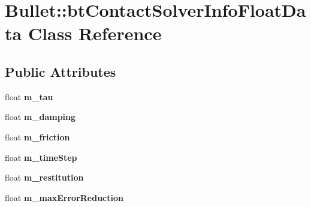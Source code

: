 \hypertarget{class_bullet_1_1bt_contact_solver_info_float_data}{\section{Bullet\+:\+:bt\+Contact\+Solver\+Info\+Float\+Data Class Reference}
\label{class_bullet_1_1bt_contact_solver_info_float_data}
}
\subsection*{Public Attributes}
\begin{DoxyCompactItemize}
\item 
\hypertarget{class_bullet_1_1bt_contact_solver_info_float_data_a7129b273c12109d4a66d04f61699b106}{float {\bfseries m\+\_\+tau}}\label{class_bullet_1_1bt_contact_solver_info_float_data_a7129b273c12109d4a66d04f61699b106}

\item 
\hypertarget{class_bullet_1_1bt_contact_solver_info_float_data_a5e024c1fbf7d2917ba3f3584804ce085}{float {\bfseries m\+\_\+damping}}\label{class_bullet_1_1bt_contact_solver_info_float_data_a5e024c1fbf7d2917ba3f3584804ce085}

\item 
\hypertarget{class_bullet_1_1bt_contact_solver_info_float_data_a78e2405d043575444710b9d87e1d3880}{float {\bfseries m\+\_\+friction}}\label{class_bullet_1_1bt_contact_solver_info_float_data_a78e2405d043575444710b9d87e1d3880}

\item 
\hypertarget{class_bullet_1_1bt_contact_solver_info_float_data_a4d8969c27712abc78dd05fc36bcf7c0e}{float {\bfseries m\+\_\+time\+Step}}\label{class_bullet_1_1bt_contact_solver_info_float_data_a4d8969c27712abc78dd05fc36bcf7c0e}

\item 
\hypertarget{class_bullet_1_1bt_contact_solver_info_float_data_a64cf63b095bfa1c2d025646cf1941992}{float {\bfseries m\+\_\+restitution}}\label{class_bullet_1_1bt_contact_solver_info_float_data_a64cf63b095bfa1c2d025646cf1941992}

\item 
\hypertarget{class_bullet_1_1bt_contact_solver_info_float_data_aacdf480fe32df49128fdfc3ca61d0c13}{float {\bfseries m\+\_\+max\+Error\+Reduction}}\label{class_bullet_1_1bt_contact_solver_info_float_data_aacdf480fe32df49128fdfc3ca61d0c13}


\end{DoxyCompactItemize}
